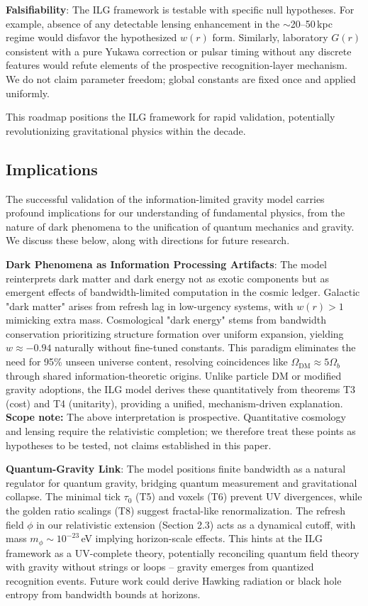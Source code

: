 \documentclass[fleqn,usenatbib]{mnras}
\begin{document}
\textbf{Falsifiability}: The ILG framework is testable with specific null hypotheses. For example, absence of any detectable lensing enhancement in the $\sim$20--50\,kpc regime would disfavor the hypothesized $w(r)$ form. Similarly, laboratory $G(r)$ consistent with a pure Yukawa correction or pulsar timing without any discrete features would refute elements of the prospective recognition-layer mechanism. We do not claim parameter freedom; global constants are fixed once and applied uniformly.

This roadmap positions the ILG framework for rapid validation, potentially revolutionizing gravitational physics within the decade.

\subsection{Implications}

The successful validation of the information-limited gravity model carries profound implications for our understanding of fundamental physics, from the nature of dark phenomena to the unification of quantum mechanics and gravity. We discuss these below, along with directions for future research.

\textbf{Dark Phenomena as Information Processing Artifacts}: The model reinterprets dark matter and dark energy not as exotic components but as emergent effects of bandwidth-limited computation in the cosmic ledger. Galactic "dark matter" arises from refresh lag in low-urgency systems, with $w(r) > 1$ mimicking extra mass. Cosmological "dark energy" stems from bandwidth conservation prioritizing structure formation over uniform expansion, yielding $w \approx -0.94$ naturally without fine-tuned constants. This paradigm eliminates the need for 95\% unseen universe content, resolving coincidences like $\Omega_\mathrm{DM} \approx 5 \Omega_b$ through shared information-theoretic origins. Unlike particle DM or modified gravity adoptions, the ILG model derives these quantitatively from theorems T3 (cost) and T4 (unitarity), providing a unified, mechanism-driven explanation.
\textbf{Scope note:} The above interpretation is prospective. Quantitative cosmology and lensing require the relativistic completion; we therefore treat these points as hypotheses to be tested, not claims established in this paper.

\textbf{Quantum-Gravity Link}: The model positions finite bandwidth as a natural regulator for quantum gravity, bridging quantum measurement and gravitational collapse. The minimal tick $\tau_0$ (T5) and voxels (T6) prevent UV divergences, while the golden ratio scalings (T8) suggest fractal-like renormalization. The refresh field $\phi$ in our relativistic extension (Section 2.3) acts as a dynamical cutoff, with mass $m_\phi \sim 10^{-23}$\,eV implying horizon-scale effects. This hints at the ILG framework as a UV-complete theory, potentially reconciling quantum field theory with gravity without strings or loops -- gravity emerges from quantized recognition events. Future work could derive Hawking radiation or black hole entropy from bandwidth bounds at horizons.
\end{document}
